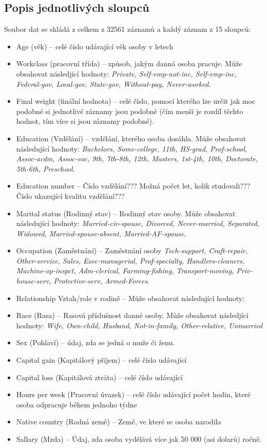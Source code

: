 \documentclass[11pt,a4paper,titlepage]{article}
\begin{document}
        \subsection{Popis jednotlivých sloupců}
            Soubor dat se skládá z celkem z 32561 záznamů a každý záznam z 15 sloupců:
            \begin{itemize}
                \item Age (věk) -- celé číslo udávající věk osoby v letech
                \item Workclass (pracovní třída) -- způsob, jakým danná osoba pracuje. Může obsahovat následjící hodnoty: \textit{Private, Self-emp-not-inc, Self-emp-inc, Federal-gov, Local-gov, State-gov, Without-pay, Never-worked}.
                \item Final weight (finální hodnota) -- celé číslo, pomocí kterého lze určit jak moc podobné si jednotlivé záznamy jsou podobné (čím menší je rozdíl těchto hodnot, tím více si jsou záznamy podobné).
                \item Education (Vzdělání) -- vzdělání, kterého osoba dosáhla. Může obsahovat následující hodnoty: \textit{Bachelors, Some-college, 11th, HS-grad, Prof-school, Assoc-acdm, Assoc-voc, 9th, 7th-8th, 12th, Masters, 1st-4th, 10th, Doctorate, 5th-6th, Preschool}.
                \item Education number -- Číslo vzdělání??? Možná počet let, kolik studovali??? Číslo ukazující kvalitu vzdělání???
                \item Marital status (Rodinný stav) -- Rodinný stav osoby. Může obsahovat následující hodnoty: \textit{Married-civ-spouse, Divorced, Never-married, Separated, Widowed, Married-spouse-absent, Married-AF-spouse}.
                \item Occupation (Zaměstnání) -- Zaměstnání osoby \textit{Tech-support, Craft-repair, Other-service, Sales, Exec-managerial, Prof-specialty, Handlers-cleaners, Machine-op-inspct, Adm-clerical, Farming-fishing, Transport-moving, Priv-house-serv, Protective-serv, Armed-Forces}.
                \item Relationship Vztah/role v rodině -- Může obsahovat následující hodnoty:
                \item Race (Rasa) -- Rasová příslušnost danné osoby. Může obsahovat následjící hodnoty: \textit{Wife, Own-child, Husband, Not-in-family, Other-relative, Unmarried}
                \item Sex (Pohlaví) -- údaj, zda se jedná o muže či ženu.
                \item Capital gain (Kapitálový příjem) -- celé číslo udávající 
                \item Capital loss (Kapitálová ztráta) -- celé číslo udávající 
                \item Hours per week (Pracovní úvazek) -- celé číslo udávající počet hodin, které osoba odpracuje během jednoho týdne
                \item Native country (Rodná země) -- Země, ve které se osoba narodila
                \item Sallary (Mzda) -- Údaj, zda osoba vydělává více jak 50 000 (asi dolarů) ročně.
            \end{itemize}
    

\end{document}
